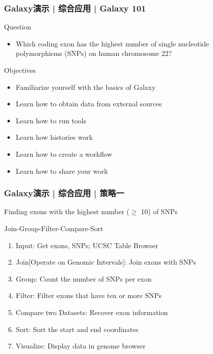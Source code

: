 \begin{frame}
  \frametitle{Galaxy演示 | \alert{综合应用} | Galaxy 101}
  \begin{block}{Question}
    \begin{itemize}
      \item Which coding exon has the highest number of single nucleotide polymorphisms (SNPs) on human chromosome 22?
    \end{itemize}
  \end{block}
  \pause
  \begin{block}{Objectives}
    \begin{itemize}
      \item Familiarize yourself with the basics of Galaxy
      \item Learn how to obtain data from external sources
      \item Learn how to run tools
      \item Learn how histories work
      \item Learn how to create a workflow
      \item Learn how to share your work
    \end{itemize}
  \end{block}
\end{frame}

\begin{frame}
  \frametitle{Galaxy演示 | \alert{综合应用} | 策略一}
  \begin{block}{Finding exons with the highest number ($\geq$ 10) of SNPs}
    \pause
    \begin{block}{Join-Group-Filter-Compare-Sort}
    \pause
  \begin{enumerate}[<+-|alert@+>]
    \item Input: Get exons, SNPs; UCSC Table Browser
    \item Join[Operate on Genomic Intervals]: Join exons with SNPs
    \item Group: Count the number of SNPs per exon 
    \item Filter: Filter exons that have ten or more SNPs
    \item Compare two Datasets: Recover exon information
    \item Sort: Sort the start and end coordinates
    \item Visualize: Display data in genome browser
  \end{enumerate}
\end{block}
  \end{block}
\end{frame}

